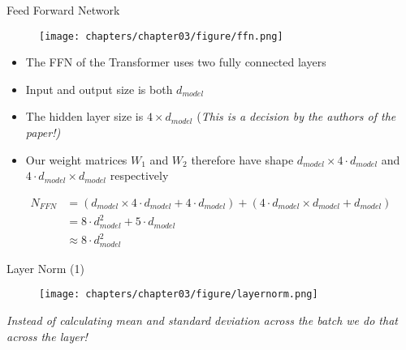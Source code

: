 
\begin{frame}{Feed Forward Network}

\begin{minipage}[c]{.44\textwidth}
    \vfill
    \begin{figure}
        \centering
        \texttt{[image: chapters/chapter03/figure/ffn.png]}
        \label{fig:enter-label}
    \end{figure}
    \vfill
\end{minipage}
\hfill
\begin{minipage}[c]{.54\textwidth}
    \begin{itemize}
        \item The FFN of the Transformer uses two fully connected layers
        \item Input and output size is both $d_{model}$
        \item The hidden layer size is $4 \times d_{model}$ (\textit{This is a decision by the authors of the paper!)}
        \item Our weight matrices $W_1$ and $W_2$ therefore have shape $d_{model} \times 4\cdot d_{model}$ and $4\cdot d_{model} \times d_{model}$ respectively
    \end{itemize}
\end{minipage}

$$
\begin{aligned}
N_{FFN} &= (d_{model} \times 4\cdot d_{model} +4\cdot d_{model}) + (4\cdot d_{model} \times d_{model} + d_{model}) \\
&= 8\cdot d_{model}^2 + 5\cdot d_{model} \\
&\approx 8\cdot d_{model}^2    
\end{aligned}
$$  

\end{frame}


\begin{frame}{Layer Norm (1)}

\begin{figure}
    \centering
    \texttt{[image: chapters/chapter03/figure/layernorm.png]}    \label{fig:Layer Norm-label}
\end{figure}

\textit{Instead of calculating mean and standard deviation across the batch we do that across the layer!} 
    
\end{frame}

